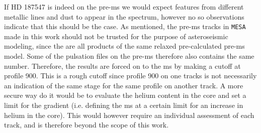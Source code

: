 If HD 187547 is indeed on the pre-ms we would expect features from different metallic lines and dust to appear in the spectrum, however no so observations indicate that this should be the case. As mentioned, the pre-ms tracks in \texttt{MESA} made in this work should not be trusted for  the purpose of asteroseismic modeling, since the are all products of the same relaxed pre-calculated pre-ms model. Some of the pulsation files on the pre-ms therefore also contains the same number. Therefore, the results are forced on to the ms by making a cutoff at profile 900. This is a rough cutoff since profile 900 on one tracks is not necessarily an indication of the same stage for the same profile on another track. A more secure way do it would be to evaluate the helium content in the core and set a limit for the gradient (i.e. defining the ms at a certain limit for an increase in helium in the core). This would however require an individual assessment of each track, and is therefore beyond the scope of this work. 



